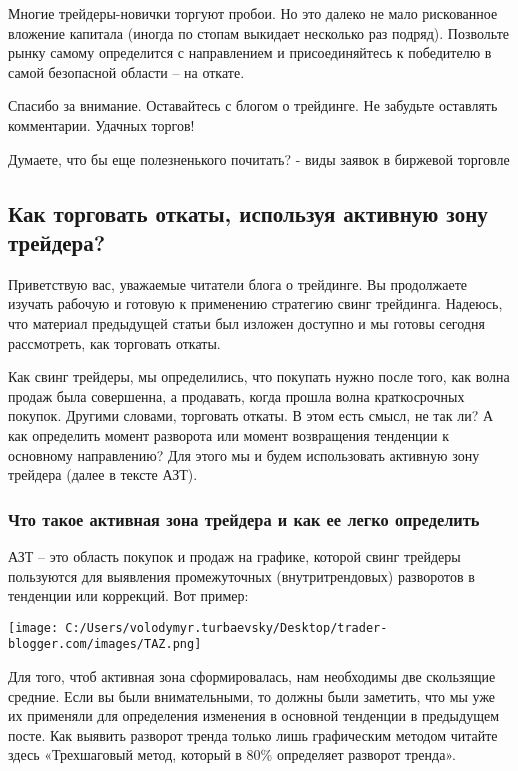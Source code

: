 \documentclass[a5paper]{article}
\begin{document}
Многие трейдеры-новички торгуют пробои. Но это далеко не мало рискованное вложение капитала (иногда по стопам выкидает несколько раз подряд). Позвольте рынку самому определится с направлением и присоединяйтесь к победителю в самой безопасной области – на откате.

Спасибо за внимание. Оставайтесь с блогом  о трейдинге. Не забудьте оставлять комментарии. Удачных торгов!


Думаете, что бы еще полезненького почитать? - виды заявок в биржевой
торговле

\subsection{Как торговать откаты, используя активную зону трейдера?}

Приветствую вас, уважаемые читатели блога о трейдинге. Вы продолжаете изучать рабочую и готовую к применению стратегию свинг трейдинга. Надеюсь, что материал предыдущей статьи был изложен доступно и мы готовы сегодня рассмотреть, как торговать откаты.

Как свинг трейдеры, мы определились, что покупать нужно после того,
как волна продаж была совершенна, а продавать, когда прошла волна
краткосрочных покупок. Другими словами, торговать откаты. В этом есть
смысл, не так ли? А как определить момент разворота или момент
возвращения тенденции к основному направлению? Для этого мы и будем
использовать активную зону трейдера (далее в тексте АЗТ).

\subsubsection{Что такое активная зона трейдера и как ее легко
  определить}

АЗТ – это область покупок и продаж на графике, которой свинг трейдеры
пользуются для выявления промежуточных (внутритрендовых) разворотов в
тенденции или коррекций. Вот пример:

\texttt{[image: C:/Users/volodymyr.turbaevsky/Desktop/trader-blogger.com/images/TAZ.png]}

Для того, чтоб активная зона сформировалась, нам необходимы две скользящие средние. Если вы были внимательными, то должны были заметить, что мы уже их применяли для определения изменения в основной тенденции в предыдущем посте. Как выявить разворот тренда только лишь графическим методом читайте здесь «Трехшаговый метод, который в 80\% определяет разворот тренда».
\end{document}

